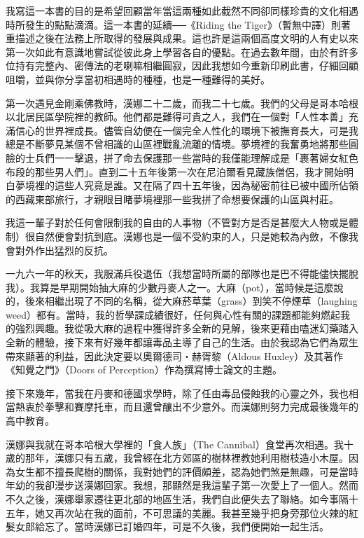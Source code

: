 我寫這一本書的目的是希望回顧當年當這兩種如此截然不同卻同樣珍貴的文化相遇時所發生的點點滴滴。這一本書的延續──《Riding
the
Tiger》（暫無中譯）則著重描述之後在法務上所取得的發展與成果。這也許是這兩個高度文明的人有史以來第一次如此有意識地嘗試從彼此身上學習各自的優點。在過去數年間，由於有許多位持有完整內、密傳法的老喇嘛相繼圓寂，因此我想如今重新印刷此書，仔細回顧咀嚼，並與你分享當初相遇時的種種，也是一種難得的美好。

第一次遇見金剛乘佛教時，漢娜二十二歲，而我二十七歲。我們的父母是哥本哈根以北居民區學院裡的教師。他們都是難得可貴之人，我們在一個對「人性本善」充滿信心的世界裡成長。儘管自幼便在一個完全人性化的環境下被撫育長大，可是我總是不斷夢見某個不曾相識的山區裡戰亂流離的情境。夢境裡的我奮勇地將那些圓臉的士兵們一一擊退，拼了命去保護那一些當時的我僅能理解成是「裹著婦女紅色布段的那些男人們」。直到二十五年後第一次在尼泊爾看見藏族僧侶，我才開始明白夢境裡的這些人究竟是誰。又在隔了四十五年後，因為秘密前往已被中國所佔領的西藏東部旅行，才親眼目睹夢境裡那一些我拼了命想要保護的山區與村莊。

我這一輩子對於任何會限制我的自由的人事物（不管對方是否是甚麼大人物或是體制）很自然便會對抗到底。漢娜也是一個不受約束的人，只是她較為內斂，不像我會對外作出猛烈的反抗。

一九六一年的秋天，我服滿兵役退伍（我想當時所屬的部隊也是巴不得能儘快擺脫我）。我算是早期開始抽大麻的少數丹麥人之一。大麻（pot），當時候是這麼說的，後來相繼出現了不同的名稱，從大麻菸草葉（grass）到笑不停煙草（laughing
weed）都有。當時，我的哲學課成績很好，任何與心性有關的課題都能夠燃起我的強烈興趣。我從吸大麻的過程中獲得許多全新的見解，後來更藉由嗑迷幻藥踏入全新的體驗，接下來有好幾年都讓毒品主導了自己的生活。由於我認為它們為眾生帶來顯著的利益，因此決定要以奧爾德司‧赫胥黎（Aldous
Huxley）及其著作《知覺之門》（Doors of
Perception）作為撰寫博士論文的主題。

接下來幾年，當我在丹麥和德國求學時，除了任由毒品侵蝕我的心靈之外，我也相當熱衷於拳擊和賽摩托車，而且還曾釀出不少意外。而漢娜則努力完成最後幾年的高中教育。

漢娜與我就在哥本哈根大學裡的「食人族」（The
Cannibal）食堂再次相遇。我十歲的那年，漢娜只有五歲，我曾經在北方郊區的樹林裡教她利用樹枝造小木屋。因為女生都不擅長爬樹的關係，我對她們的評價頗差，認為她們煞是無趣，可是當時年幼的我卻漫步送漢娜回家。我想，那顯然是我這輩子第一次愛上了一個人。然而不久之後，漢娜舉家遷往更北部的地區生活，我們自此便失去了聯絡。如今事隔十五年，她又再次站在我的面前，不可思議的美麗。我甚至幾乎把身旁那位火辣的紅髮女郎給忘了。當時漢娜已訂婚四年，可是不久後，我們便開始一起生活。

